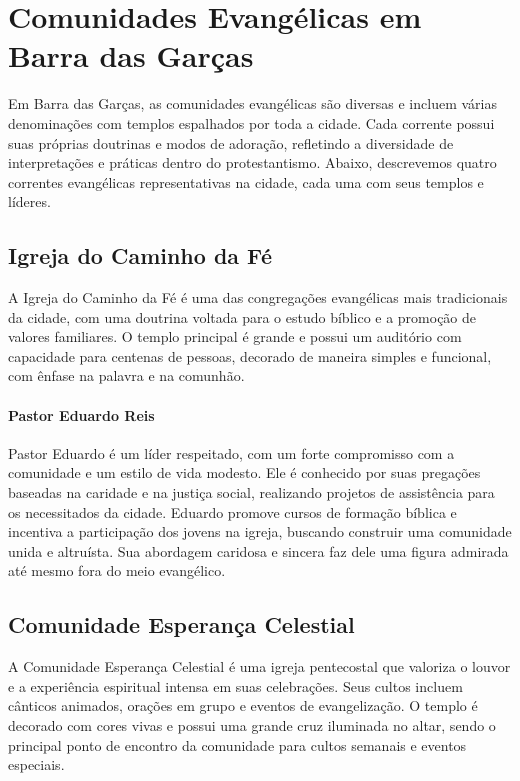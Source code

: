 \section{Comunidades Evangélicas em Barra das Garças}

Em Barra das Garças, as comunidades evangélicas são diversas e incluem várias denominações com templos espalhados por toda a cidade. Cada corrente possui suas próprias doutrinas e modos de adoração, refletindo a diversidade de interpretações e práticas dentro do protestantismo. Abaixo, descrevemos quatro correntes evangélicas representativas na cidade, cada uma com seus templos e líderes.

\subsection{Igreja do Caminho da Fé}

A Igreja do Caminho da Fé é uma das congregações evangélicas mais tradicionais da cidade, com uma doutrina voltada para o estudo bíblico e a promoção de valores familiares. O templo principal é grande e possui um auditório com capacidade para centenas de pessoas, decorado de maneira simples e funcional, com ênfase na palavra e na comunhão.

\paragraph{Pastor Eduardo Reis}  
Pastor Eduardo é um líder respeitado, com um forte compromisso com a comunidade e um estilo de vida modesto. Ele é conhecido por suas pregações baseadas na caridade e na justiça social, realizando projetos de assistência para os necessitados da cidade. Eduardo promove cursos de formação bíblica e incentiva a participação dos jovens na igreja, buscando construir uma comunidade unida e altruísta. Sua abordagem caridosa e sincera faz dele uma figura admirada até mesmo fora do meio evangélico.

\subsection{Comunidade Esperança Celestial}

A Comunidade Esperança Celestial é uma igreja pentecostal que valoriza o louvor e a experiência espiritual intensa em suas celebrações. Seus cultos incluem cânticos animados, orações em grupo e eventos de evangelização. O templo é decorado com cores vivas e possui uma grande cruz iluminada no altar, sendo o principal ponto de encontro da comunidade para cultos semanais e eventos especiais.

